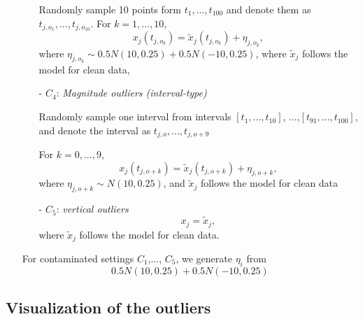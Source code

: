 \documentclass{article}
\begin{document}
\begin{itemize}
\begin{itemize}
       \vspace{1ex}
   Randomly sample 10  points form $t_1,..., t_{100}$ and denote them as $t_{j,o_1},..., t_{j,o_{10}}$. For $k = 1,..., 10$,   
    $$x_{j}(t_{j,o_k}) = \tilde{x}_j(t_{j,o_k}) + \eta_{j,o_k},$$ where $\eta_{j,o_k} \sim 0.5 N(10, 0.25) + 0.5 N(-10, 0.25)$, where
 $\tilde{x}_j$ follows the model for clean data,
    \vspace{1ex}
    \item[- ] $C_4$: \textit{Magnitude outliers (interval-type)}

    
       \vspace{1ex}
     Randomly sample one interval from intervals $[t_1,...,t_{10}]$, ...,$[t_{91},...,t_{100}]$,   and denote the interval as $t_{j,o},..., t_{j,o+9}$
     
     For $k = 0,..., 9$,   
    $$x_{j}(t_{j,o + k}) = \tilde{x}_j(t_{j,o + k}) + \eta_{j,o+k},$$ where $\eta_{j,o + k} \sim  N(10, 0.25)$, and 
 $\tilde{x}_j$ follows the model for clean data
    \vspace{1ex}
 
    \item[- ] $C_5$: \textit{vertical outliers} 
       \vspace{1ex}
   $$ x_j = \tilde{x}_j,$$
   where $\tilde{x}_j$ follows the model for clean data. 
\end{itemize}
For contaminated settings $C_1$,..., $C_5$, we generate $\eta_i$ from $$ 0.5N(10,0.25) + 0.5N(-10,0.25)$$
\end{itemize}




\subsection{Visualization of the outliers}
\end{document}
